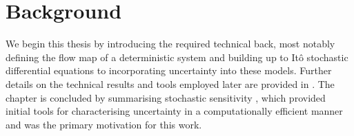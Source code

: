 
\chapter{Background}\label{ch:background}
We begin this thesis by introducing the required technical back, most notably defining the flow map of a deterministic system and building up to It\^o stochastic differential equations to incorporating uncertainty into these models.
Further details on the technical results and tools employed later are provided in .
The chapter is concluded by summarising stochastic sensitivity \citep{Balasuriya_2020_StochasticSensitivityComputable}, which provided initial tools for characterising uncertainty in a computationally efficient manner and was the primary motivation for this work.





